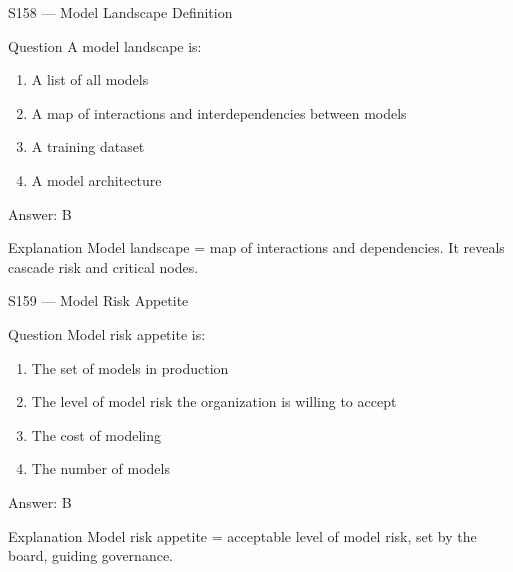 \documentclass[aspectratio=169,8pt]{beamer}
\begin{document}
	\begin{frame}{S158 --- Model Landscape Definition}
		\begin{block}{Question}
			A model landscape is:
			\begin{enumerate}
				\item A list of all models
				\item A map of interactions and interdependencies between models
				\item A training dataset
				\item A model architecture
			\end{enumerate}
		\end{block}
		\begin{exampleblock}{Answer: B}\end{exampleblock}
		\begin{block}{Explanation}
			Model landscape = map of interactions and dependencies. It reveals cascade risk and critical nodes.
		\end{block}
	\end{frame}
	
	\begin{frame}{S159 --- Model Risk Appetite}
		\begin{block}{Question}
			Model risk appetite is:
			\begin{enumerate}
				\item The set of models in production
				\item The level of model risk the organization is willing to accept
				\item The cost of modeling
				\item The number of models
			\end{enumerate}
		\end{block}
		\begin{exampleblock}{Answer: B}\end{exampleblock}
		\begin{block}{Explanation}
			Model risk appetite = acceptable level of model risk, set by the board, guiding governance.
		\end{block}
	\end{frame}
	
\end{document}
